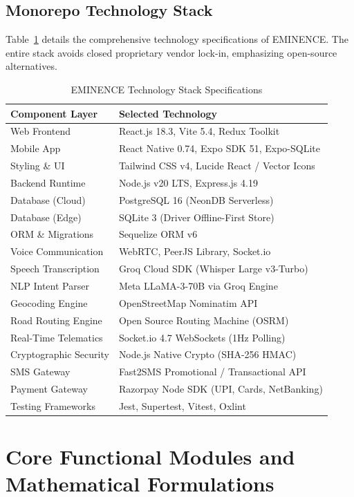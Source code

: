 \documentclass[conference]{IEEEtran}
\begin{document}
\subsection{Monorepo Technology Stack}
Table~\ref{tab:tech_stack} details the comprehensive technology specifications of EMINENCE. The entire stack avoids closed proprietary vendor lock-in, emphasizing open-source alternatives.

\begin{table}[htbp]
\centering
\caption{EMINENCE Technology Stack Specifications}
\label{tab:tech_stack}
\begin{tabular}{ll}
\toprule
\textbf{Component Layer} & \textbf{Selected Technology} \\
\midrule
Web Frontend & React.js 18.3, Vite 5.4, Redux Toolkit \\
Mobile App & React Native 0.74, Expo SDK 51, Expo-SQLite \\
Styling \& UI & Tailwind CSS v4, Lucide React / Vector Icons \\
Backend Runtime & Node.js v20 LTS, Express.js 4.19 \\
Database (Cloud) & PostgreSQL 16 (NeonDB Serverless) \\
Database (Edge) & SQLite 3 (Driver Offline-First Store) \\
ORM \& Migrations & Sequelize ORM v6 \\
Voice Communication & WebRTC, PeerJS Library, Socket.io \\
Speech Transcription & Groq Cloud SDK (Whisper Large v3-Turbo) \\
NLP Intent Parser & Meta LLaMA-3-70B via Groq Engine \\
Geocoding Engine & OpenStreetMap Nominatim API \\
Road Routing Engine & Open Source Routing Machine (OSRM) \\
Real-Time Telematics & Socket.io 4.7 WebSockets (1Hz Polling) \\
Cryptographic Security & Node.js Native Crypto (SHA-256 HMAC) \\
SMS Gateway & Fast2SMS Promotional / Transactional API \\
Payment Gateway & Razorpay Node SDK (UPI, Cards, NetBanking) \\
Testing Frameworks & Jest, Supertest, Vitest, Oxlint \\
\bottomrule
\end{tabular}
\end{table}

\section{Core Functional Modules and Mathematical Formulations}
\end{document}
